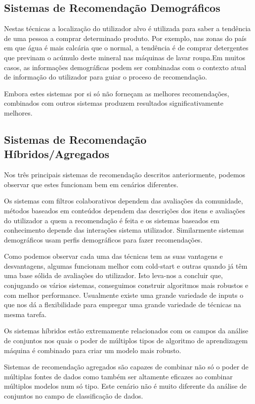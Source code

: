\subsection{Sistemas de Recomendação Demográficos}
\par\hfill
\par Nestas técnicas a localização do utilizador alvo é utilizada para saber a tendência de uma pessoa a comprar determinado produto. Por exemplo, nas zonas do país em que água é mais calcária que o normal, a tendência é de comprar detergentes que previnam o acúmulo deste mineral nas máquinas de lavar roupa.Em muitos casos, as informações demográficas podem ser combinadas com o contexto atual de informação do utilizador para guiar o proceso de recomendação.
\par Embora estes sistemas por si só não forneçam as melhores recomendações, combinados com outros sistemas produzem resultados significativamente melhores.


\subsection{Sistemas de Recomendação Híbridos/Agregados}
\par\hfill
 \par Nos três principais sistemas de recomendação descritos anteriormente, podemos observar que estes funcionam bem em cenários diferentes. 
 \par Os sistemas com filtros colaborativos dependem das avaliações da comunidade, métodos baseados em conteúdos dependem das descrições dos itens e avaliações do utilizador a quem a recomendação é feita e os sistemas baseados em conhecimento depende das interações sistema utilizador. Similarmente sistemas demográficos usam perfis demográficos para fazer recomendações.
 \par Como podemos observar cada uma das técnicas tem as suas vantagens e desvantagens, algumas funcionam melhor com cold-start e outras quando já têm uma base sólida de avaliações do utilizador. Isto leva-nos a concluir que, conjugando os vários sistemas, conseguimos construir algoritmos mais robustos e com melhor performance. Usualmente existe uma grande variedade de inputs o que nos dá a flexibilidade para empregar uma grande variedade de técnicas na mesma tarefa.
 \par Os sistemas híbridos estão extremamente relacionados com os campos da análise de conjuntos nos quais o poder de múltiplos tipos de algoritmo de aprendizagem máquina é combinado para criar um modelo mais robusto.
 \par Sistemas de recomendação agregados são capazes de combinar não só o poder de múltiplas fontes de dados como também ser altamente eficazes ao combinar múltiplos modelos num só tipo. Este cenário não é muito diferente da análise de conjuntos no campo de classificação de dados.

